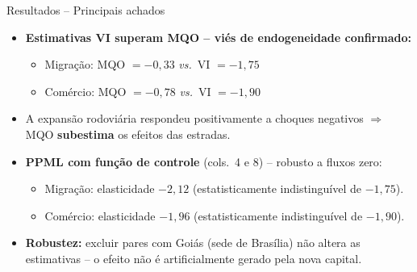 \begin{frame}{Resultados -- Principais achados}
    \begin{itemize}
        \item \textbf{Estimativas VI superam MQO -- viés de endogeneidade confirmado:}
        \begin{itemize}
            \item Migração: MQO $= -0{,}33$ \textit{vs.}\ VI $= -1{,}75$
            \item Comércio: MQO $= -0{,}78$ \textit{vs.}\ VI $= -1{,}90$
        \end{itemize}
        \item A expansão rodoviária respondeu positivamente a choques negativos $\Rightarrow$ MQO \textbf{subestima} os efeitos das estradas.

        \vspace{0.15cm}

        \item \textbf{PPML com função de controle} (cols.\ 4 e 8) -- robusto a fluxos zero:
        \begin{itemize}
            \item Migração: elasticidade $-2{,}12$ (estatisticamente indistinguível de $-1{,}75$).
            \item Comércio: elasticidade $-1{,}96$ (estatisticamente indistinguível de $-1{,}90$).
        \end{itemize}

        \vspace{0.15cm}

        \item \textbf{Robustez:} excluir pares com Goiás (sede de Brasília) não altera as estimativas -- o efeito não é artificialmente gerado pela nova capital.
    \end{itemize}
\end{frame}